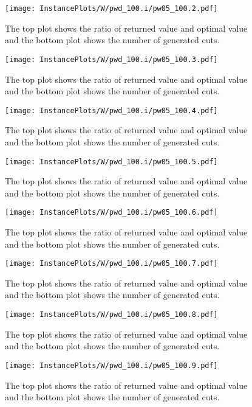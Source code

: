 \documentclass[10pt,a4paper]{article}
\begin{document}
\begin{figure}[H]
\texttt{[image: InstancePlots/W/pwd\_100.i/pw05\_100.2.pdf]}
\caption{The top plot shows the ratio of returned value and optimal value     and the bottom plot shows the number of generated cuts.}
\end{figure}

\begin{figure}[H]
\texttt{[image: InstancePlots/W/pwd\_100.i/pw05\_100.3.pdf]}
\caption{The top plot shows the ratio of returned value and optimal value     and the bottom plot shows the number of generated cuts.}
\end{figure}

\begin{figure}[H]
\texttt{[image: InstancePlots/W/pwd\_100.i/pw05\_100.4.pdf]}
\caption{The top plot shows the ratio of returned value and optimal value     and the bottom plot shows the number of generated cuts.}
\end{figure}

\begin{figure}[H]
\texttt{[image: InstancePlots/W/pwd\_100.i/pw05\_100.5.pdf]}
\caption{The top plot shows the ratio of returned value and optimal value     and the bottom plot shows the number of generated cuts.}
\end{figure}

\begin{figure}[H]
\texttt{[image: InstancePlots/W/pwd\_100.i/pw05\_100.6.pdf]}
\caption{The top plot shows the ratio of returned value and optimal value     and the bottom plot shows the number of generated cuts.}
\end{figure}

\begin{figure}[H]
\texttt{[image: InstancePlots/W/pwd\_100.i/pw05\_100.7.pdf]}
\caption{The top plot shows the ratio of returned value and optimal value     and the bottom plot shows the number of generated cuts.}
\end{figure}

\begin{figure}[H]
\texttt{[image: InstancePlots/W/pwd\_100.i/pw05\_100.8.pdf]}
\caption{The top plot shows the ratio of returned value and optimal value     and the bottom plot shows the number of generated cuts.}
\end{figure}

\begin{figure}[H]
\texttt{[image: InstancePlots/W/pwd\_100.i/pw05\_100.9.pdf]}
\caption{The top plot shows the ratio of returned value and optimal value     and the bottom plot shows the number of generated cuts.}
\end{figure}
\end{document}
